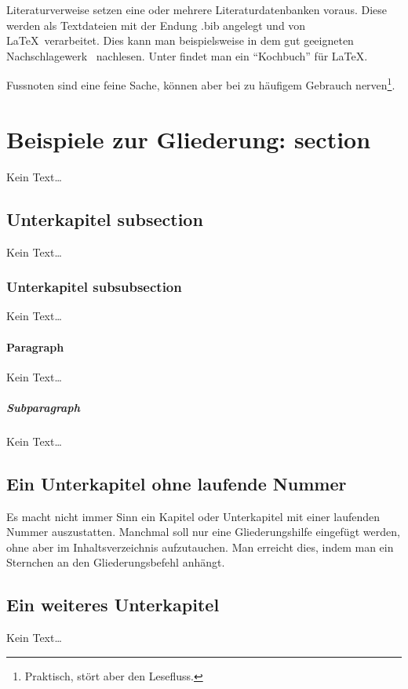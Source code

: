 Literaturverweise setzen eine oder mehrere Literaturdatenbanken voraus.
Diese werden als Textdateien mit der Endung {\ttfamily .bib} angelegt und
von \LaTeX\ verarbeitet. Dies kann man beispielsweise in dem gut
geeigneten Nachschlagewerk~\cite{book:latex} nachlesen. Unter
\cite{link:latexkochbuch} findet man ein "`Kochbuch"' für \LaTeX.

Fussnoten sind eine feine Sache, können aber bei zu häufigem Gebrauch
nerven\footnote{Praktisch, stört aber den Lesefluss.}.



\section{Beispiele zur Gliederung: section}
Kein Text\ldots



\subsection{Unterkapitel subsection}
Kein Text\ldots



\subsubsection{Unterkapitel subsubsection}
Kein Text\ldots

\paragraph{Paragraph}
Kein Text\ldots

\subparagraph{Subparagraph}
Kein Text\ldots



\subsection*{Ein Unterkapitel ohne laufende Nummer}
Es macht nicht immer Sinn ein Kapitel oder Unterkapitel mit einer laufenden
Nummer auszustatten. Manchmal soll nur eine Gliederungshilfe
eingefügt werden, ohne aber im Inhaltsverzeichnis aufzutauchen.
Man erreicht dies, indem man ein Sternchen an den Gliederungsbefehl
anhängt.



\subsection{Ein weiteres Unterkapitel}
Kein Text\ldots



